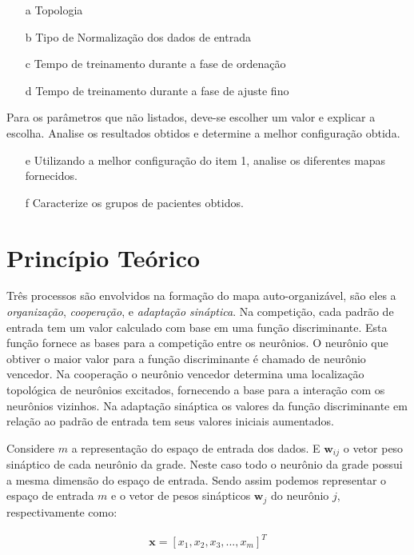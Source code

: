 \documentclass[journal, a4paper]{IEEEtran}
\begin{document}
\begin{itemize}[Configuração do mapa:]
\item[a] Topologia
\item[b] Tipo de Normalização dos dados de entrada
\item[c] Tempo de treinamento durante a fase de ordenação
\item[d] Tempo de treinamento durante a fase de ajuste fino
\end{itemize}

Para os parâmetros que não listados, deve-se escolher um valor e explicar a escolha. Analise os resultados obtidos e determine a melhor configuração obtida.

\begin{itemize}[Análise dos resultados:]
\item[e] Utilizando a melhor configuração do item 1, analise os diferentes mapas fornecidos.
\item[f] Caracterize os grupos de pacientes obtidos.
\end{itemize}


\section{Princípio Teórico}



Três processos são envolvidos na formação do mapa auto-organizável, são eles a \textit{organização}, \textit{cooperação}, e \textit{adaptação sináptica}. Na competição, cada padrão de entrada tem um valor calculado com base em uma função discriminante. Esta função fornece as bases para a competição entre os neurônios. O neurônio que obtiver o maior valor para a função discriminante é chamado de neurônio vencedor. Na cooperação o neurônio vencedor determina uma localização topológica de neurônios excitados, fornecendo a base para a interação com os neurônios vizinhos. Na adaptação sináptica os valores da função discriminante em relação ao padrão de entrada tem seus valores iniciais aumentados. 

Considere $\textit{m}$ a representação do espaço de entrada dos dados. E $\textbf{w}_{ij}$ o vetor peso sináptico de cada neurônio da grade. Neste caso todo o neurônio da grade possui a mesma dimensão do espaço de entrada. Sendo assim podemos representar o espaço de entrada $\textit{m}$ e o vetor de pesos sinápticos $\textbf{w}_{j}$ do neurônio $j$, respectivamente como:

\begin{eqnarray}
	\textbf{x}=[x_{1}, x_{2}, x_{3}, ..., x_{m}]^{T} 
\end{eqnarray}
\end{document}
